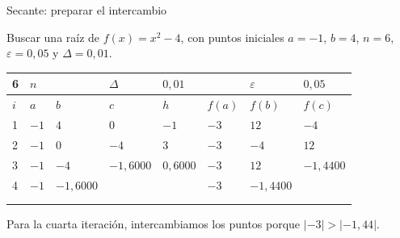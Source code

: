 \documentclass[main.tex]{subfiles}
\begin{document}
\begin{frame}[t]{Secante: preparar el intercambio}
\begin{minipage}[t][13mm][t]{\textwidth}\small Buscar una raíz de $f(x)=x^2-4$, con puntos iniciales $a=-1$, $b=4$, $n=6$, $\varepsilon=0{,}05$ y $\Delta=0{,}01$.\end{minipage}\par{\scriptsize\setlength{\tabcolsep}{2pt}\renewcommand{\arraystretch}{1}\begin{center}\begin{tabular}{|C{.04\textwidth}|C{.112\textwidth}|C{.112\textwidth}|C{.112\textwidth}|C{.112\textwidth}|C{.112\textwidth}|C{.112\textwidth}|C{.112\textwidth}|}
\hline
\rule{0pt}{4.3mm}6 & $n$ &  &  $\Delta$  & $0{,}01$ &  & $\varepsilon$ & $0{,}05$\\\hline
\rule{0pt}{4.3mm}$i$ & $a$ & $b$ & $c$ & $h$ & $f(a)$ & $f(b)$ & $f(c)$\\\hline
\rule{0pt}{4.3mm}1 & $-1$ & $4$ & $0$ & $-1$ & $-3$ & $12$ & $-4$\\\hline
\rule{0pt}{4.3mm}2 & $-1$ & $0$ & $-4$ & $3$ & $-3$ & $-4$ & $12$\\\hline
\rule{0pt}{4.3mm}3 & $-1$ & $-4$ & $-1{,}6000$ & $0{,}6000$ & $-3$ & $12$ & $-1{,}4400$\\\hline
\rule{0pt}{4.3mm}4 & $-1$ & $-1{,}6000$ &  &  & $-3$ & $-1{,}4400$ & \\\hline
\rule{0pt}{4.3mm} &  &  &  &  &  &  & \\\hline
\rule{0pt}{4.3mm} &  &  &  &  &  &  & \\\hline
\end{tabular}\end{center}}\begin{minipage}[t][10mm][t]{\textwidth}\footnotesize Para la cuarta iteración, intercambiamos los puntos porque $|-3|>|-1{,}44|$.\end{minipage}
\end{frame}
\end{document}

